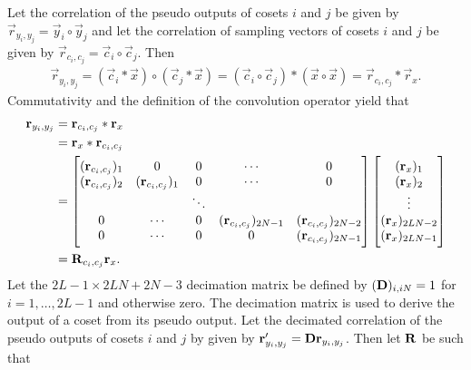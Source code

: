 \documentclass[a4paper, openany, oneside]{memoir}
\begin{document}
Let the correlation of the pseudo outputs of cosets $i$ and $j$ be given by $\vec{r}_{y_i,y_j} = \vec{y}_i \circ \vec{y}_j$ and let the correlation of sampling vectors of cosets $i$ and $j$ be given by $\vec{r}_{c_i,c_j} = \vec{c}_i \circ \vec{c}_j$. Then
\begin{align*}
    \vec{r}_{y_i,y_j} =(\vec{c}_i \ast \vec{x}) \circ (\vec{c}_j \ast \vec{x}) = (\vec{c}_i \circ \vec{c}_j) \ast (\vec{x} \circ \vec{x}) = \vec{r}_{c_i,c_j} \ast \vec{r}_x.
\end{align*}
Commutativity and the definition of the convolution operator yield that
\begin{align*}
    \boldsymbol{\mathbf{r}}_{y_i,y_j}
    &= \boldsymbol{\mathbf{r}}_{c_i,c_j} \ast \boldsymbol{\mathbf{r}}_x\\
    &= \boldsymbol{\mathbf{r}}_x \ast \boldsymbol{\mathbf{r}}_{c_i,c_j} \\
    &=
    \begin{bmatrix}
        (\boldsymbol{\mathbf{r}}_{c_i,c_j})_1 & 0 & 0& \cdots & 0 \\
        (\boldsymbol{\mathbf{r}}_{c_i,c_j})_2 & (\boldsymbol{\mathbf{r}}_{c_i,c_j})_1 & 0 & \cdots & 0 \\
        &  & \ddots &  & \\
        0 &  \cdots & 0 & (\boldsymbol{\mathbf{r}}_{c_i,c_j})_{2N-1} & (\boldsymbol{\mathbf{r}}_{c_i,c_j})_{2N-2} \\
        0 &  \cdots & 0& 0 & (\boldsymbol{\mathbf{r}}_{c_i,c_j})_{2N - 1} \\
    \end{bmatrix}
    \begin{bmatrix}
        (\boldsymbol{\mathbf{r}}_x)_1 \\
        (\boldsymbol{\mathbf{r}}_x)_2 \\
        \vdots \\
        (\boldsymbol{\mathbf{r}}_x)_{2LN-2} \\
        (\boldsymbol{\mathbf{r}}_x)_{2LN-1}
    \end{bmatrix}\\
    &= \boldsymbol{\mathbf{R}}_{c_i,c_j} \boldsymbol{\mathbf{r}}_x.
\end{align*}
Let the $2L-1\times 2LN+2N-3$ decimation matrix be defined by $(\boldsymbol{\mathbf{D}})_{i,iN} = 1$ for $i=1,\ldots,2L-1$ and otherwise zero. The decimation matrix is used to derive the output of a coset from its pseudo output. Let the decimated correlation of the pseudo outputs of cosets $i$ and $j$ by given by $\boldsymbol{\mathbf{r}}'_{y_i,y_j} = \boldsymbol{\mathbf{D}} \boldsymbol{\mathbf{r}}_{y_i,y_j}$. Then let $\boldsymbol{\mathbf{R}}$ be such that
\end{document}
